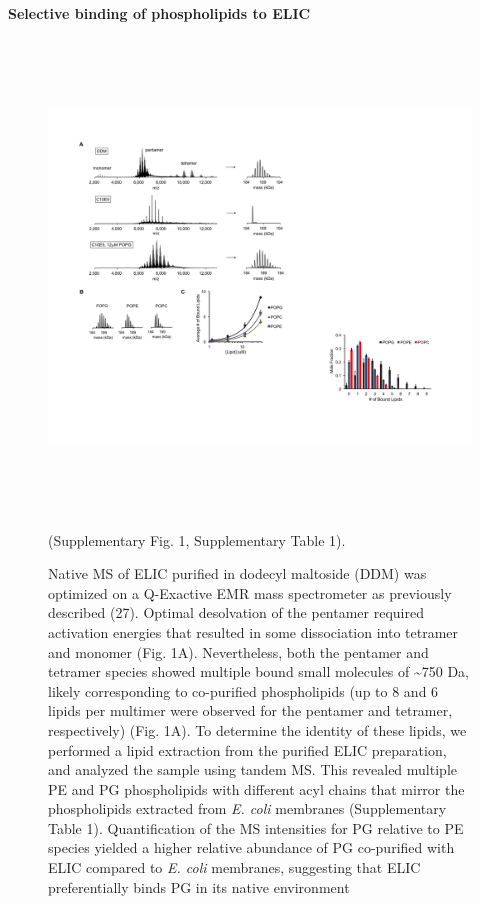 \textbf{Selective binding of phospholipids to ELIC}
\begin{figure}
\includegraphics[width=4.80625in,height=4.94155in]{./pandoc_test/media/image1.pdf}

\caption{Native MS of ELIC purified in dodecyl maltoside (DDM) was optimized on a
Q-Exactive EMR mass spectrometer as previously described (27). Optimal
desolvation of the pentamer required activation energies that resulted
in some dissociation into tetramer and monomer (Fig. 1A). Nevertheless,
both the pentamer and tetramer species showed multiple bound small
molecules of \textasciitilde{}750 Da, likely corresponding to
co-purified phospholipids (up to 8 and 6 lipids per multimer were
observed for the pentamer and tetramer, respectively) (Fig. 1A). To
determine the identity of these lipids, we performed a lipid extraction
from the purified ELIC preparation, and analyzed the sample using tandem
MS. This revealed multiple PE and PG phospholipids with different acyl
chains that mirror the phospholipids extracted from \emph{E. coli}
membranes (Supplementary Table 1). Quantification of the MS intensities
for PG relative to PE species yielded a higher relative abundance of PG
co-purified with ELIC compared to \emph{E. coli} membranes, suggesting
that ELIC preferentially binds PG in its native environment}
(Supplementary Fig. 1, Supplementary Table 1).
\end{figure}
